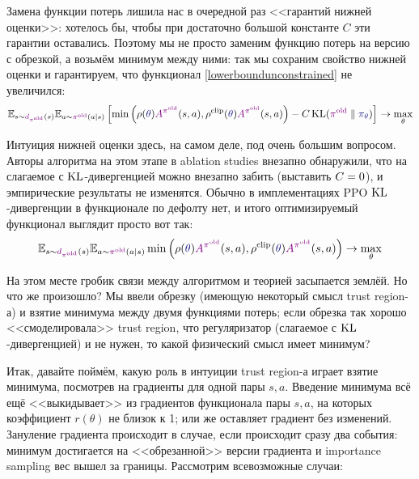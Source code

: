 Замена функции потерь лишила нас в очередной раз <<гарантий нижней оценки>>: хотелось бы, чтобы при достаточно большой константе $C$ эти гарантии оставались. Поэтому мы не просто заменим функцию потерь на версию с обрезкой, а возьмём минимум между ними: так мы сохраним свойство нижней оценки и гарантируем, что функционал \eqref{lowerboundunconstrained} не увеличился: 
\begin{equation}\label{PPOlowerbound}
\E_{s \sim \textcolor{ChadPurple}{d_{\pi^{\old}}}(s)} \E_{a \sim \textcolor{ChadPurple}{\pi^{\old}}(a \mid s)}  \left[ \min \left( \rho(\textcolor{ChadBlue}{\theta}) \textcolor{ChadPurple}{A^{\pi^{\old}}}(s, a), \rho^{\clip}(\textcolor{ChadBlue}{\theta}) \textcolor{ChadPurple}{A^{\pi^{\old}}}(s, a)\right) - C \KL(\textcolor{ChadPurple}{\pi^{\old}} \parallel \textcolor{ChadBlue}{\pi_\theta}) \right] \to \max_\theta
\end{equation}

Интуиция нижней оценки здесь, на самом деле, под очень большим вопросом. Авторы алгоритма на этом этапе в ablation studies внезапно обнаружили, что на слагаемое с $\operatorname{KL}$-дивергенцией можно внезапно забить (выставить $C \HM= 0$), и эмпирические результаты не изменятся. Обычно в имплементациях PPO $\operatorname{KL}$-дивергенции в функционале по дефолту нет, и итого оптимизируемый функционал выглядит просто вот так:
\begin{equation}\label{PPOobjective}
\E_{s \sim \textcolor{ChadPurple}{d_{\pi^{\old}}}(s)} \E_{a \sim \textcolor{ChadPurple}{\pi^{\old}}(a \mid s)} \min \left( \rho(\textcolor{ChadBlue}{\theta}) \textcolor{ChadPurple}{A^{\pi^{\old}}}(s, a), \rho^{\clip}(\textcolor{ChadBlue}{\theta}) \textcolor{ChadPurple}{A^{\pi^{\old}}}(s, a)\right) \to \max_\theta
\end{equation}

На этом месте гробик связи между алгоритмом и теорией засыпается землёй. Но что же произошло? Мы ввели обрезку (имеющую некоторый смысл trust region-а) и взятие минимума между двумя функциями потерь; если обрезка так хорошо <<смоделировала>> trust region, что регуляризатор (слагаемое с $\operatorname{KL}$-дивергенцией) и не нужен, то какой физический смысл имеет минимум? 

Итак, давайте поймём, какую роль в интуиции trust region-а играет взятие минимума, посмотрев на градиенты для одной пары $s, a$. Введение минимума всё ещё <<выкидывает>> из градиентов функционала пары $s, a$, на которых коэффициент $r(\theta)$ не близок к 1; или же оставляет градиент без изменений. Зануление градиента происходит в случае, если происходит сразу два события: минимум достигается на <<обрезанной>> версии градиента и importance sampling вес вышел за границы. Рассмотрим всевозможные случаи:


